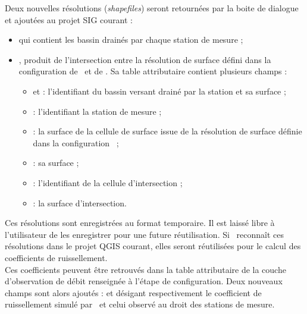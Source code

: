 Deux nouvelles résolutions (\textit{shapefiles}) seront retournées par la boite de
dialogue et ajoutées au projet SIG courant :
\begin{itemize}
    \item {} qui contient les bassin drainés par chaque station de
        mesure ;

    \item {}, produit de l'intersection entre la résolution de surface
        défini dans la configuration de \cwv~et de . Sa table attributaire
        contient plusieurs champs :
        \begin{itemize}
            \item[$-$]  et : l'identifiant du
                bassin versant drainé par la station et sa surface ;

            \item[$-$]  : l'identifiant la station de mesure ;

            \item[$-$]  : la surface de la cellule de surface
                issue de la résolution de surface définie dans la configuration
                \cwv~;

            \item[$-$]  : sa surface ;

            \item[$-$]  : l'identifiant de la cellule d'intersection
                ;

            \item[$-$]  : la surface d'intersection.
        \end{itemize}
\end{itemize}

Ces résolutions sont enregistrées au format temporaire. Il est laissé libre à l'utilisateur
de les enregistrer pour une future réutilisation. Si \cwv~reconnaît ces
résolutions dans le projet QGIS courant, elles seront réutilisées pour le calcul
des coefficients de ruissellement. \\

Ces coefficients peuvent être retrouvés dans la table attributaire de la couche d'observation
de débit renseignée à l'étape de configuration. Deux nouveaux champs sont alors
ajoutés :  et  désigant respectivement le
coefficient de ruissellement simulé par \cawaqs~et celui observé au droit des
stations de mesure.

